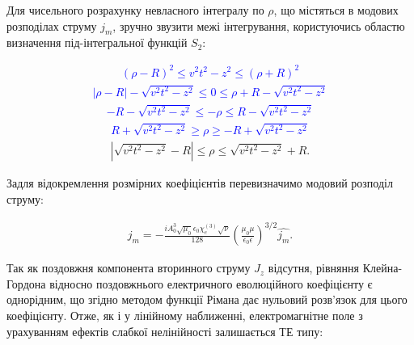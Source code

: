 Для чисельного розрахунку невласного інтегралу по $ \rho $, що містяться в 
модових розподілах струму $ j_m $, зручно звузити межі інтегрування, 
користуючись областю визначення під-інтегральної функцій $ S_2 $:

\textcolor{blue} { \begin{equation*} \begin{aligned}
(\rho - R)^2 \leq v^2t^2 - z^2 \leq (\rho + R)^2
\end{aligned} \end{equation*} }
%
\textcolor{blue} { \begin{equation*} \begin{aligned}
| \rho - R | - \sqrt{v^2t^2 - z^2} \leq 0 \leq \rho + R - \sqrt{v^2t^2 - z^2}
\end{aligned} \end{equation*} }
%
\textcolor{blue} { \begin{equation*} \begin{aligned}
- R - \sqrt{v^2t^2 - z^2} \leq - \rho \leq R - \sqrt{v^2t^2 - z^2}
\end{aligned} \end{equation*} }
%
\textcolor{blue} { \begin{equation*} \begin{aligned}
R + \sqrt{v^2t^2 - z^2} \geq \rho \geq - R + \sqrt{v^2t^2 - z^2}
\end{aligned} \end{equation*} }
%
\begin{equation} \begin{aligned}
\left| \sqrt{v^2t^2 - z^2} - R \right| \leq \rho \leq \sqrt{v^2t^2 - z^2} + R.
\end{aligned} \end{equation}

Задля відокремлення розмірних коефіцієнтів перевизначимо модовий розподіл 
струму:

\begin{equation} \begin{aligned}
j_m = - \frac{i A_0^3 \sqrt{\mu_0} \epsilon_0 \chi_e^{(3)} \sqrt{\nu}}{128}
\left( \frac{\mu_0 \mu}{\epsilon_0 \epsilon} \right)^{3/2} \hat{j_m}.
\end{aligned} \end{equation}

Так як поздовжня компонента вторинного струму $ J_z $ відсутня, рівняння 
Клейна-Гордона відносно поздовжнього електричного еволюційного коефіцієнту 
є однорідним, що згідно методом функції Рімана дає нульовий розв'язок для
цього коефіцієнту. Отже, як і у лінійному наближенні, електромагнітне поле 
з урахуванням ефектів слабкої нелінійності залишається ТЕ типу:

